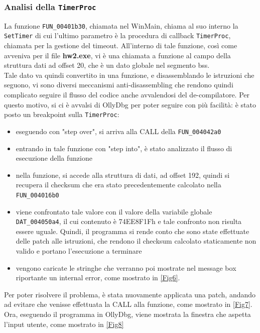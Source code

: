 \documentclass{article}
\begin{document}
\subsubsection{Analisi della \texttt{TimerProc}}
La funzione \texttt{FUN\_00401b30}, chiamata nel WinMain, chiama al suo interno la \texttt{SetTimer} di cui l'ultimo parametro è la procedura di callback \texttt{TimerProc}, chiamata per la gestione del timeout. All'interno di tale funzione, così come avveniva per il file \textbf{hw2.exe}, vi è una chiamata a funzione al campo della struttura dati ad offset 20, che è un dato globale nel segmento bss.\\Tale dato va quindi convertito in una funzione, e disassemblando le istruzioni che seguono, vi sono diversi meccanismi anti-disassembling che rendono quindi complicato seguire il flusso del codice anche avvalendosi del de-compilatore. Per questo motivo, si ci è avvalsi di OllyDbg per poter seguire con più facilità: è stato posto un breakpoint sulla \texttt{TimerProc}:
\begin{itemize}
\item eseguendo con "step over", si arriva alla CALL della \texttt{FUN\_004042a0}
\item entrando in tale funzione con "step into", è stato analizzato il flusso di esecuzione della funzione
\item nella funzione, si accede alla struttura di dati, ad offset 192, quindi si recupera il checksum che era stato precedentemente calcolato nella \texttt{FUN\_004016b0}
\item viene confrontato tale valore con il valore della variabile globale \texttt{DAT\_004050a4}, il cui contenuto è 74EE8F1Fh e tale confronto non risulta essere uguale. Quindi, il programma si rende conto che sono state effettuate delle patch alle istruzioni, che rendono il checksum calcolato staticamente non valido e portano l'esecuzione a terminare
\item vengono caricate le stringhe che verranno poi mostrate nel message box riportante un internal error, come mostrato in \ref{Fig6}.
\end{itemize}
Per poter risolvere il problema, è stata nuovamente applicata una patch, andando ad evitare che venisse effettuata la CALL alla funzione, come mostrato in \ref{Fig7}.\\Ora, eseguendo il programma in OllyDbg, viene mostrata la finestra che aspetta l'input utente, come mostrato in \ref{Fig8}
\end{document}
